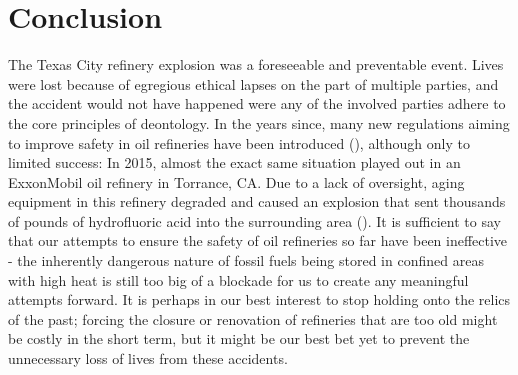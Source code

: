 \documentclass[12pt]{article}
\begin{document}
	\section*{Conclusion}
	The Texas City refinery explosion was a foreseeable and preventable event. Lives were lost because of egregious ethical lapses on the part of multiple parties, and the accident would not have happened were any of the involved parties adhere to the core principles of deontology. In the years since, many new regulations aiming to improve safety in oil refineries have been introduced (\cite{calaw}), although only to limited success: In 2015, almost the exact same situation played out in an ExxonMobil oil refinery in Torrance, CA. Due to a lack of oversight, aging equipment in this refinery degraded and caused an explosion that sent thousands of pounds of hydrofluoric acid into the surrounding area (\cite{exxonmobilreport}). It is sufficient to say that our attempts to ensure the safety of oil refineries so far have been ineffective - the inherently dangerous nature of fossil fuels being stored in confined areas with high heat is still too big of a blockade for us to create any meaningful attempts forward. It is perhaps in our best interest to stop holding onto the relics of the past; forcing the closure or renovation of refineries that are too old might be costly in the short term, but it might be our best bet yet to prevent the unnecessary loss of lives from these accidents.
	
	\newpage
	\printbibliography
\end{document}
